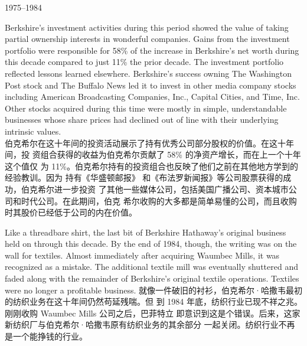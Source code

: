 \begin{section}{1975--1984}
\begin{verseparallel}
  {
    Berkshire's investment activities during this period showed the value of
    taking partial ownership interests in wonderful companies. Gains from the
    investment portfolio were responsible for 58\% of the increase in
    Berkshire's net worth during this decade compared to just 11\% the prior
    decade. The investment portfolio reflected lessons learned elsewhere.
    Berkshire's success owning The Washington Post stock and The Buffalo News
    led it to invest in other media company stocks including American
    Broadcasting Companies, Inc., Capital Cities, and Time, Inc. Other stocks
    acquired during this time were mostly in simple, understandable businesses
    whose share prices had declined out of line with their underlying intrinsic
    values. \\
  }
  {
    伯克希尔在这十年间的投资活动展示了持有优秀公司部分股权的价值。在这十年间，投
    资组合获得的收益为伯克希尔贡献了 58\% 的净资产增长，而在上一个十年这个值仅
    为 11\%。伯克希尔持有的投资组合也反映了他们之前在其他地方学到的经验教训。因为
    持有《华盛顿邮报》 和《布法罗新闻报》等公司股票获得的成功，伯克希尔进一步投资
    了其他一些媒体公司，包括美国广播公司、资本城市公司和时代公司。在此期间，伯克
    希尔收购的大多都是简单易懂的公司，而且收购时其股价已经低于公司的内在价值。
  }
\end{verseparallel}

\begin{verseparallel}
  {
    Like a threadbare shirt, the last bit of Berkshire Hathaway's original
    business held on through this decade. By the end of 1984, though, the
    writing was on the wall for textiles. Almost immediately after acquiring
    Waumbec Mills, it was recognized as a mistake. The additional textile mill
    was eventually shuttered and faded along with the remainder of Berkshire's
    original textile operations. Textiles were no longer a profitable business.
  }
  {
    就像一件破旧的衬衫，伯克希尔·哈撒韦最初的纺织业务在这十年间仍然苟延残喘。但
    到 1984 年底，纺织行业已现不祥之兆。刚刚收购 Waumbec Mills 公司之后，巴菲特立
    即意识到这是个错误。后来，这家新纺织厂与伯克希尔·哈撒韦原有纺织业务的其余部分
    一起关闭。纺织行业不再是一个能挣钱的行业。
  }
\end{verseparallel}
\end{section}

